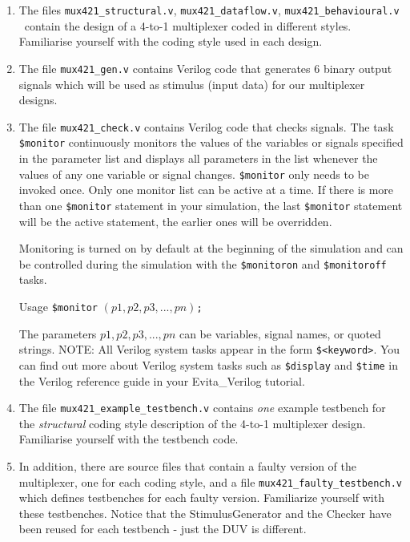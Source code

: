 \documentclass[a4paper,11pt]{article}
\begin{document}
\begin{enumerate}
\item The files \verb#mux421_structural.v#, \verb#mux421_dataflow.v#,
  \verb#mux421_behavioural.v# \ contain the design of a 4-to-1 multiplexer
  coded in different styles. Familiarise yourself with the coding style used in
  each design.
  
\item The file \verb#mux421_gen.v# contains Verilog code that generates 6
  binary output signals which will be used as stimulus (input data) for our
  multiplexer designs.
  
\item The file \verb#mux421_check.v# contains Verilog code that checks signals.
  The task \verb#$monitor# continuously monitors the values of the variables or
  signals specified in the parameter list and displays all parameters in the
  list whenever the values of any one variable or signal changes.
  \verb#$monitor# only needs to be invoked once. Only one monitor list can be
  active at a time. If there is more than one \verb#$monitor# statement in your
  simulation, the last \verb#$monitor# statement will be the active statement,
  the earlier ones will be overridden.
  
  Monitoring is turned on by default at the beginning of the simulation and can
  be controlled during the simulation with the \verb#$monitoron# and
  \verb#$monitoroff# tasks.
  
  Usage \verb#$monitor# $(p1,p2,p3,...,pn)$\verb#;#
  
  The parameters $p1,p2,p3,...,pn$ can be variables, signal names, or quoted
  strings. NOTE: All Verilog system tasks appear in the form
  \verb#$<keyword>#.  You can find out more about Verilog system tasks such as
  \verb#$display# and \verb#$time# in the Verilog reference guide in your
  Evita\_Verilog tutorial.
  
\item The file \verb#mux421_example_testbench.v# contains {\em one\/} example
  testbench for the {\em structural} coding style description of the 4-to-1
  multiplexer design. Familiarise yourself with the testbench code.

\item In addition, there are source files that contain a faulty version of the
multiplexer, one for each coding style, and a file
\verb#mux421_faulty_testbench.v# which defines testbenches for each faulty
version. Familiarize yourself with these testbenches. Notice that the
StimulusGenerator and the Checker have been reused for each testbench - just
the DUV is different.

\end{enumerate}
\end{document}
